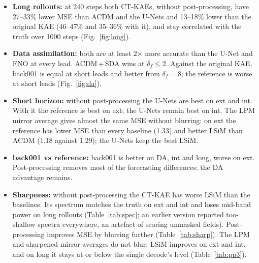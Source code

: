 \documentclass[10pt]{article}
\begin{document}
\begin{itemize}\itemsep1pt
\item \textbf{Long rollouts:} at 240 steps both CT-KAEs, without post-processing, have 27--33\% lower
  MSE than ACDM and the U-Nets and 13--18\% lower than the original KAE (46--47\% and 35--36\% with
  it), and stay correlated with the truth over 1000 steps (Fig.~\ref{fig:long}).
\item \textbf{Data assimilation:} both are at least 2$\times$ more accurate than the U-Net and FNO at
  every lead. ACDM\,+\,SDA wins at $\delta_f\le2$. Against the original KAE, back001 is equal at
  short leads and better from $\delta_f=8$; the reference is worse at short leads (Fig.~\ref{fig:da}).
\item \textbf{Short horizon:} without post-processing the U-Nets are best on ext and int. With it the
  reference is best on ext; the U-Nets remain best on int. The LPM mirror average gives
  almost the same MSE without blurring: on ext the reference has lower MSE than every baseline
  (1.33) and better LSiM than ACDM (1.18 against 1.29); the U-Nets keep the best LSiM.
\item \textbf{back001 vs reference:} back001 is better on DA, int and long, worse on ext.
  Post-processing removes most of the forecasting differences; the DA advantage remains.
\item \textbf{Sharpness:} without post-processing the CT-KAE has worse LSiM than the baselines. Its
  spectrum matches the truth on ext and int and loses mid-band power on long rollouts
  (Table~\ref{tab:spec}; an earlier version reported too-shallow spectra everywhere, an artefact of
  scoring unmasked fields). Post-processing improves MSE by blurring further
  (Table~\ref{tab:sharp}). The LPM and sharpened mirror averages do not blur: LSiM improves on ext
  and int, and on long it stays at or below the single decode's level (Table~\ref{tab:pp3}).
\end{itemize}
\end{document}
